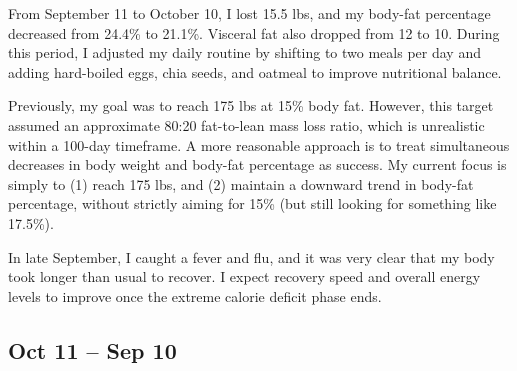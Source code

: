 From September 11 to October 10, I lost 15.5 lbs, and my body-fat percentage decreased from 24.4\% to 21.1\%. Visceral fat also dropped from 12 to 10. During this period, I adjusted my daily routine by shifting to two meals per day and adding hard-boiled eggs, chia seeds, and oatmeal to improve nutritional balance.

Previously, my goal was to reach 175 lbs at 15\% body fat. However, this target assumed an approximate 80:20 fat-to-lean mass loss ratio, which is unrealistic within a 100-day timeframe. A more reasonable approach is to treat simultaneous decreases in body weight and body-fat percentage as success. My current focus is simply to (1) reach 175 lbs, and (2) maintain a downward trend in body-fat percentage, without strictly aiming for 15\% (but still looking for something like 17.5\%).

In late September, I caught a fever and flu, and it was very clear that my body took longer than usual to recover. I expect recovery speed and overall energy levels to improve once the extreme calorie deficit phase ends.


\subsection{Oct 11 -- Sep 10}


